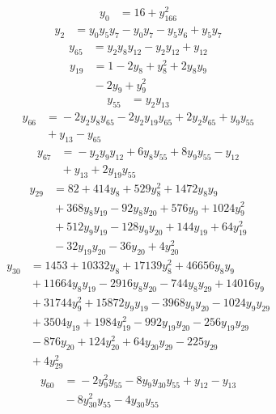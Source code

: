 \begin{align*}
y_{0} &={} 16 +y_{166}^{2}
\end{align*}
\begin{align*}
y_{2} &={} y_{0}y_{5}y_{7} -y_{0}y_{7} -y_{5}y_{6} +y_{5}y_{7}
\end{align*}
\begin{align*}
y_{65} &={} y_{2}y_{8}y_{12} -y_{2}y_{12} +y_{12}
\end{align*}
\begin{align*}
y_{19} &={} 1 -2y_{8} +y_{8}^{2} +2y_{8}y_{9} \\
 &{} -2y_{9} +y_{9}^{2}
\end{align*}
\begin{align*}
y_{55} &={} y_{2}y_{13}
\end{align*}
\begin{align*}
y_{66} &={} -2y_{2}y_{8}y_{65} -2y_{2}y_{19}y_{65} +2y_{2}y_{65} +y_{9}y_{55} \\
 &{} +y_{13} -y_{65}
\end{align*}
\begin{align*}
y_{67} &={} -y_{2}y_{9}y_{12} +6y_{8}y_{55} +8y_{9}y_{55} -y_{12} \\
 &{} +y_{13} +2y_{19}y_{55}
\end{align*}
\begin{align*}
y_{29} &={} 82 +414y_{8} +529y_{8}^{2} +1472y_{8}y_{9} \\
 &{} +368y_{8}y_{19} -92y_{8}y_{20} +576y_{9} +1024y_{9}^{2} \\
 &{} +512y_{9}y_{19} -128y_{9}y_{20} +144y_{19} +64y_{19}^{2} \\
 &{} -32y_{19}y_{20} -36y_{20} +4y_{20}^{2}
\end{align*}
\begin{align*}
y_{30} &={} 1453 +10332y_{8} +17139y_{8}^{2} +46656y_{8}y_{9} \\
 &{} +11664y_{8}y_{19} -2916y_{8}y_{20} -744y_{8}y_{29} +14016y_{9} \\
 &{} +31744y_{9}^{2} +15872y_{9}y_{19} -3968y_{9}y_{20} -1024y_{9}y_{29} \\
 &{} +3504y_{19} +1984y_{19}^{2} -992y_{19}y_{20} -256y_{19}y_{29} \\
 &{} -876y_{20} +124y_{20}^{2} +64y_{20}y_{29} -225y_{29} \\
 &{} +4y_{29}^{2}
\end{align*}
\begin{align*}
y_{60} &={} -2y_{9}^{2}y_{55} -8y_{9}y_{30}y_{55} +y_{12} -y_{13} \\
 &{} -8y_{30}^{2}y_{55} -4y_{30}y_{55}
\end{align*}
